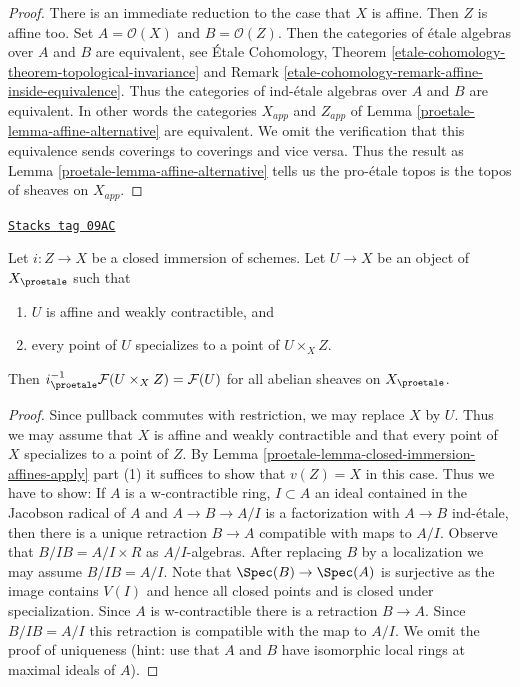 \begin{proof}

There is an immediate reduction to the case that $X$ is affine.
Then $Z$ is affine too. Set $A = \mathcal{O}(X)$ and $B = \mathcal{O}(Z)$.
Then the categories of \'etale algebras over
$A$ and $B$ are equivalent, see
\'Etale Cohomology, Theorem
\ref{etale-cohomology-theorem-topological-invariance} and
Remark \ref{etale-cohomology-remark-affine-inside-equivalence}.
Thus the categories of ind-\'etale algebras over $A$ and $B$ are
equivalent. In other words the categories $X_{app}$ and $Z_{app}$
of Lemma \ref{proetale-lemma-affine-alternative} are equivalent.
We omit the verification
that this equivalence sends coverings to coverings and vice versa.
Thus the result as Lemma \ref{proetale-lemma-affine-alternative}
tells us the pro-\'etale topos is the topos of sheaves on $X_{app}$.
\end{proof}

\begin{lemma}
\label{proetale-lemma-compute-i-star}
\href{https://stacks.math.columbia.edu/tag/09AC}{\texttt{Stacks tag 09AC}}

Let $i : Z \to X$ be a closed immersion of schemes.
Let $U \to X$ be an object of $X_\proetale$ such that
\begin{enumerate}
\item $U$ is affine and weakly contractible, and
\item every point of $U$ specializes to a point of $U \times_X Z$.
\end{enumerate}
Then $i_\proetale^{-1}\mathcal{F}(U \times_X Z) = \mathcal{F}(U)$
for all abelian sheaves on $X_\proetale$.
\end{lemma}

\begin{proof}

Since pullback commutes with restriction, we may replace $X$ by $U$.
Thus we may assume that $X$ is affine and weakly contractible
and that every point of $X$ specializes to a point of $Z$.
By Lemma \ref{proetale-lemma-closed-immersion-affines-apply} part (1)
it suffices to show that $v(Z) = X$ in this case.
Thus we have to show: If $A$ is a w-contractible ring, $I \subset A$
an ideal contained in the Jacobson radical of $A$ and $A \to B \to A/I$
is a factorization with $A \to B$ ind-\'etale, then there is
a unique retraction $B \to A$ compatible with maps to $A/I$.
Observe that $B/IB = A/I \times R$ as $A/I$-algebras.
After replacing $B$ by a localization we may assume $B/IB = A/I$.
Note that $\Spec(B) \to \Spec(A)$ is surjective as the image
contains $V(I)$ and hence all closed points and is closed under
specialization. Since $A$ is w-contractible there is a retraction $B \to A$.
Since $B/IB = A/I$ this retraction is compatible with the map to $A/I$.
We omit the proof of uniqueness (hint: use that $A$ and $B$ have
isomorphic local rings at maximal ideals of $A$).
\end{proof}

